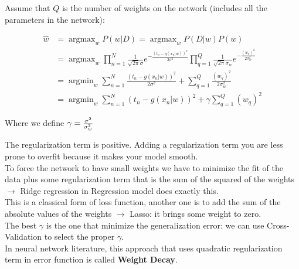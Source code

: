 Assume that $Q$ is the number of weights on the network (includes all the parameters in the network): 

$$
\begin{aligned}
\widehat{w} &=\operatorname{argmax}_{w} P(w | D)=\operatorname{argmax}_{w} P(D | w) P(w) \\
&=\operatorname{argmax}_{w} \prod_{n=1}^{N} \frac{1}{\sqrt{2 \pi} \sigma} e^{-\frac{\left(t_{n}-g\left(x_{n} | w\right)\right)^{2}}{2 \sigma^{2}}} \prod_{q=1}^{Q} \frac{1}{\sqrt{2 \pi} \sigma_{w}} e^{-\frac{\left(w_{q}\right)^{2}}{2 \sigma_{w}^{2}}} \\
&=\operatorname{argmin}_{w} \sum_{n=1}^{N} \frac{\left(t_{n}-g\left(x_{n} | w\right)\right)^{2}}{2 \sigma^{2}}+\sum_{q=1}^{Q} \frac{\left(w_{q}\right)^{2}}{2 \sigma_{w}^{2}} \\
&=\operatorname{argmin}_{w} \sum_{n=1}^{N}\left(t_{n}-g\left(x_{n} | w\right)\right)^{2}+\gamma \sum_{q=1}^{Q}\left(w_{q}\right)^{2}
\end{aligned}
$$

Where we define $\gamma = {\sigma^2 \over \sigma_w^2}$

The regularization term is positive. Adding a regularization term you are less prone to overfit because it makes your model smooth. \\
To force the network to have small weights we have to minimize the fit of the data plus some regularization term that is the sum of the squared of the weights $\rightarrow$ Ridge regression in Regression model does exactly this.\\ 
This is a classical form of loss function, another one is to add the sum of the absolute values of the weights $\rightarrow$ Lasso: it brings some weight to zero. \\

The best $\gamma$ is the one that minimize the generalization error: we can use Cross-Validation to select the proper $\gamma$. \\
In neural network literature, this approach that uses quadratic regularization term in error function is called \textbf{Weight Decay}. 





